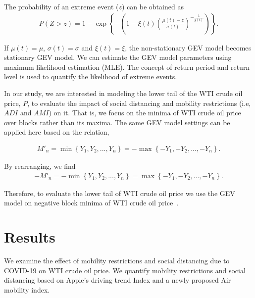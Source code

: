 \documentclass[review]{elsarticle}
\begin{document}
The probability of an extreme event ($z$) can be obtained as
\begin{eqnarray}\label{prob_1}
P\left(Z>z\right)= 1 - \exp \left\lbrace -\left(  1 - \xi(t)  \left( \frac{\mu(t)-z}{\sigma(t)}\right) ^{-\frac{1}{\xi(t) }}\right)  \right\rbrace.
\end{eqnarray}

If $\mu(t)=\mu$, $\sigma(t)=\sigma$ and $\xi(t)= \xi$, the non-stationary GEV model becomes stationary GEV model. We can estimate the GEV model parameters using maximum likelihood estimation (MLE). The concept of return period and return level is used to quantify the likelihood of extreme events. 


In our study, we are interested in modeling the lower tail of the WTI crude oil price, $P$, to evaluate the impact of social distancing and mobility restrictions (i.e, $ADI$ and $AMI$) on it. That is, we focus on the minima of WTI crude oil price over blocks rather than its maxima. The same GEV model settings can be applied here based on the relation,


\begin{eqnarray}\label{EVT:Min}
M'_n=\min\left\lbrace Y_1, Y_2,...,Y_n\right\rbrace =-\max\left\lbrace -Y_1, -Y_2,...,-Y_n\right\rbrace.
\end{eqnarray}

By rearranging, we find
\begin{eqnarray}\label{EVT:Min}
-M'_n=-\min\left\lbrace Y_1, Y_2,...,Y_n\right\rbrace = \max\left\lbrace -Y_1, -Y_2,...,-Y_n\right\rbrace.
\end{eqnarray}

Therefore, to evaluate the lower tail of WTI crude oil price we use the GEV model on negative block minima of WTI crude oil price~\citep{JSSv072i08}.

\section{Results}\label{sec:result}

We examine the effect of mobility restrictions and social distancing due to COVID-19 on WTI crude oil price. We quantify mobility restrictions and social distancing based on Apple's driving trend Index and a newly proposed Air mobility index. 
\end{document}

